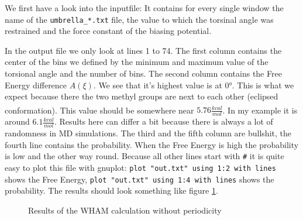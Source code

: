 \documentclass[a4paper,11pt]{scrartcl}
\newcommand{\myCite}[1]{\textsuperscript{\cite{#1}}}
\begin{document}
We first have a look into the inputfile: It contains for every single window the name of the \texttt{umbrella\_*.txt} file, the value to which the torsinal angle was restrained and the force constant of the biasing potential.

In the output file we only look at lines 1 to 74. The first column contains the center of the bins we defined by the minimum and maximum value of the torsional angle and the number of bins. The second column contains the Free Energy difference $A(\xi)$. We see that it's highest value is at 0°. This is what we expect because there the two methyl groups are next to each other (eclipsed conformation). This value should be somewhere near $5.76 \frac{kcal}{mol}$\myCite{becker_development_2015}. In my example it is around $6.1 \frac{kcal}{mol}$. Results here can differ a bit because there is always a lot of randomness in MD simulations. The third and the fifth column are bullshit, the fourth line contains the probability. When the Free Energy is high the probability is low and the other way round. Because all other lines start with \texttt{\#} it is quite easy to plot this file with gnuplot: \texttt{plot "out.txt" using 1:2 with lines} shows the Free Energy, \texttt{plot "out.txt" using 1:4 with lines} shows the probability. The results should look something like figure \ref{fig:wham_result}.

\begin{figure} [htb]
	\caption{Results of the WHAM calculation without periodicity}
	\label{fig:wham_result}
\end{figure} 
\end{document}

